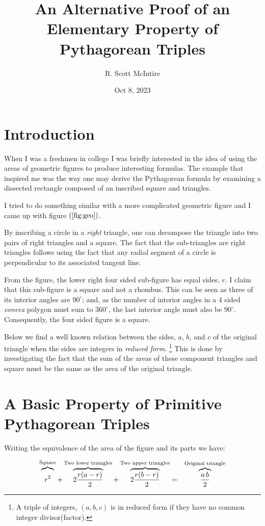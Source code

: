 \documentclass[12pt]{article}
\title{An Alternative Proof of an Elementary Property of Pythagorean Triples}
\author{R. Scott McIntire}
\date{Oct 8, 2023}
\begin{document}
\maketitle

\section{Introduction}
When I was a freshmen in college I was briefly interested in the idea of 
using the areas of geometric figures to
produce interesting formulas. The example that inspired me was the way one 
may derive the Pythagorean formula
by examining a dissected rectangle composed of 
an inscribed square and triangles. 

I tried to do something similar with a more complicated geometric figure and 
I came up with figure $(\ref{fig:geo})$.

By inscribing a circle in a {\em right\/} triangle, one can decompose the triangle 
into two pairs of right triangles and a square. The fact that the sub-triangles
are right triangles follows using the fact that 
any radial segment of a circle is perpendicular to its
associated tangent line. 

From the figure, the lower right four sided sub-figure has equal sides, $r$.
I claim that this sub-figure is a square and not a rhombus.
This can be seen as three of its interior angles are 
$90^\circ$; and, as the number of interior angles in a 4 sided {\em convex\/} 
polygon must sum to $360^\circ$, the last interior angle must also be $90^\circ$.
Consequently, the four sided figure is a square.

Below we find a well known relation between the sides, $a$, $b$, and $c$ of the
original triangle when the sides are integers in {\em reduced form\/}.%
\footnote{A triple of integers, $(a, b, c)$ is in reduced form if 
they have no common integer divisor(factor).}
This is done by investigating the fact that the sum of the areas
of these component triangles 
and square must be the same as the area of the original triangle. 

\section{A Basic Property of Primitive Pythagorean Triples}
Writing the equivalence of the area of the figure and its parts we have:

\begin{eqnarray}
    \overbrace{\vphantom{\frac{X^1}{X}}r^2}^{\text{Square}} 
    + \overbrace{2 \frac{r(a - r)}{2}}^{\text{Two lower triangles}} 
    + \overbrace{2 \frac{r(b-r)}{2}}^{\text{Two upper triangles}}  
    &=& \overbrace{\frac{a\, b}{2}}^{\text{Original triangle}}  
\end{eqnarray}
\end{document}
